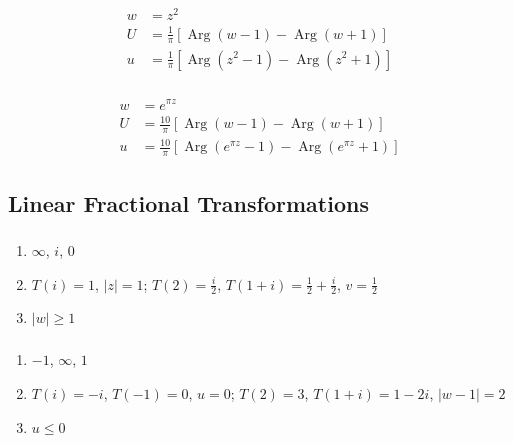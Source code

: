 \documentclass{article}
\newcommand{\Arg}{\operatorname{Arg}}
\begin{document}
\begin{align*}
  w & = z^2                                             \\
  U & = \frac{1}{\pi} [\Arg (w - 1) - \Arg (w + 1)]     \\
  u & = \frac{1}{\pi} [\Arg (z^2 - 1) - \Arg (z^2 + 1)]
\end{align*}

\setcounter{subsubsection}{24}
\subsubsection{}

\begin{align*}
  w & = e^{\pi z}                                                    \\
  U & = \frac{10}{\pi} [\Arg (w - 1) - \Arg (w + 1)]                 \\
  u & = \frac{10}{\pi} [\Arg (e^{\pi z} - 1) - \Arg (e^{\pi z} + 1)]
\end{align*}

\subsection{Linear Fractional Transformations}

\subsubsection{}

\begin{enumerate}
  \item $\infty$, $i$, $0$

  \item $T(i) = 1$, $|z| = 1$; $T(2) = \frac{i}{2}$, $T(1 + i) = \frac{1}{2} + \frac{i}{2}$, $v = \frac{1}{2}$

  \item $|w| \ge 1$
\end{enumerate}

\setcounter{subsubsection}{2}
\subsubsection{}

\begin{enumerate}
  \item $-1$, $\infty$, $1$

  \item $T(i) = -i$, $T(-1) = 0$, $u = 0$; $T(2) = 3$, $T(1 + i) = 1 - 2 i$, $|w - 1| = 2$

  \item $u \le 0$
\end{enumerate}
\end{document}
